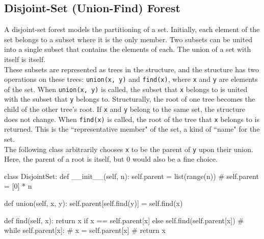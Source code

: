 \documentclass[12pt, titlepage]{article}
\begin{document}
\subsection{Disjoint-Set (Union-Find) Forest}
A disjoint-set forest models the partitioning of a set. Initially, each element of the set belongs to a subset where it is the only member. Two subsets can be united into a single subset that contains the elements of each. The union of a set with itself is itself. \\

These subsets are represented as trees in the structure, and the structure has two operations on these trees: \texttt{union(x, y)} and \texttt{find(x)}, where \texttt{x} and \texttt{y} are elements of the set. When \texttt{union(x, y)} is called, the subset that \texttt{x} belongs to is united with the subset that \texttt{y} belongs to. Structurally, the root of one tree becomes the child of the other tree's root. If \texttt{x} and \texttt{y} belong to the same set, the structure does not change. When \texttt{find(x)} is called, the root of the tree that \texttt{x} belongs to is returned. This is the ``representative member" of the set, a kind of ``name" for the set. \\

The following class arbitrarily chooses \texttt{x} to be the parent of \texttt{y} upon their union. Here, the parent of a root is itself, but $0$ would also be a fine choice.
\medskip
\begin{python}
class DisjointSet:
    def __init__(self, n):
        self.parent = list(range(n))
        # self.parent = [0] * n

    def union(self, x, y):
        self.parent[self.find(y)] = self.find(x)

    def find(self, x):
        return x if x == self.parent[x] else self.find(self.parent[x])
        # while self.parent[x]:
        #     x = self.parent[x]
        # return x
\end{python}
\bigskip
\end{document}

